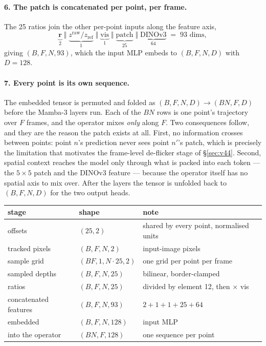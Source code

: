 \documentclass[11pt,a4paper]{article}
\begin{document}
\paragraph{6. The patch is concatenated per point, per frame.} The 25 ratios join the other
per-point inputs along the feature axis,
%
\[
  \underbrace{\mathbf{r}}_{2}
  \;\Vert\; \underbrace{z^{\mathrm{raw}}/z_{\mathrm{ref}}}_{1}
  \;\Vert\; \underbrace{\text{vis}}_{1}
  \;\Vert\; \underbrace{\text{patch}}_{25}
  \;\Vert\; \underbrace{\text{DINOv3}}_{64}
  \;=\; 93 \text{ dims},
\]
%
giving $(B,F,N,93)$, which the input MLP embeds to $(B,F,N,D)$ with $D=128$.

\paragraph{7. Every point is its own sequence.} The embedded tensor is permuted and folded as
$(B,F,N,D)\to(BN,F,D)$ before the Mamba-3 layers run. Each of the $BN$ rows is one point's
trajectory over $F$ frames, and the operator mixes \emph{only} along $F$. Two consequences follow,
and they are the reason the patch exists at all. First, no information crosses between points: point
$n$'s prediction never sees point $n'$'s patch, which is precisely the limitation that motivates the
frame-level de-flicker stage of \S\ref{sec:v44}. Second, spatial context reaches the model only
through what is packed into each token --- the $5{\times}5$ patch and the DINOv3 feature --- because
the operator itself has no spatial axis to mix over. After the layers the tensor is unfolded back to
$(B,F,N,D)$ for the two output heads.

\begin{center}
\begin{tabular}{lll}
\toprule
stage & shape & note \\
\midrule
offsets                & $(25,2)$              & shared by every point, normalised units \\
tracked pixels         & $(B,F,N,2)$           & input-image pixels \\
sample grid            & $(BF,1,N{\cdot}25,2)$ & one grid per point per frame \\
sampled depths         & $(B,F,N,25)$          & bilinear, border-clamped \\
ratios                 & $(B,F,N,25)$          & divided by element 12, then $\times$ vis \\
concatenated features  & $(B,F,N,93)$          & $2+1+1+25+64$ \\
embedded               & $(B,F,N,128)$         & input MLP \\
into the operator      & $(BN,F,128)$          & one sequence per point \\
\bottomrule
\end{tabular}
\end{center}
\end{document}
